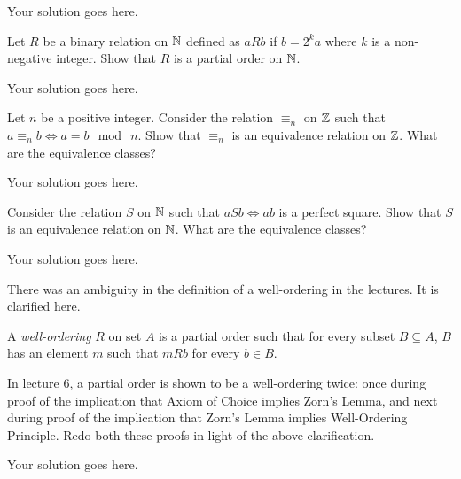 \documentclass[12pt]{article}
\begin{document}
    \begin{solution}
        Your solution goes here.
    \end{solution}

    \begin{question}
        Let $R$ be a binary relation on $\mathbb{N}$ defined as $aRb$ if $b = 2^k a$ where $k$ is a non-negative integer. Show that $R$ is a partial order on $\mathbb{N}$.
    \end{question}
    
    \begin{solution}
        Your solution goes here.
    \end{solution}

    \begin{question}
        Let $n$ be a positive integer. Consider the relation $\equiv_n$ on $\mathbb{Z}$ such that $a \equiv_n b \iff a = b \mod \ n$. Show that $\equiv_n$ is an equivalence relation on $\mathbb{Z}$. What are the equivalence classes?
    \end{question}

    \begin{solution}
        Your solution goes here.
    \end{solution}

    \begin{question}
        Consider the relation $S$ on $\mathbb{N}$ such that $aSb \iff ab$ is a perfect square. Show that $S$ is an equivalence relation on $\mathbb{N}$. What are the equivalence classes?
    \end{question}
    
    \begin{solution}
        Your solution goes here.
    \end{solution}

    \begin{question}
        There was an ambiguity in the definition of a well-ordering in the lectures. It is clarified here. 
        
        A {\em well-ordering} $R$ on set $A$ is a partial order such that for every subset $B\subseteq A$, $B$ has an element $m$ such that $mRb$ for every $b\in B$.
        
        In lecture 6, a partial order is shown to be a well-ordering twice: once during proof of the implication that Axiom of Choice implies Zorn's Lemma, and next during proof of the implication that Zorn's Lemma implies Well-Ordering Principle. Redo both these proofs in light of the above clarification.
    \end{question}

    \begin{solution}
        Your solution goes here.
    \end{solution}

    
    
\end{document}
